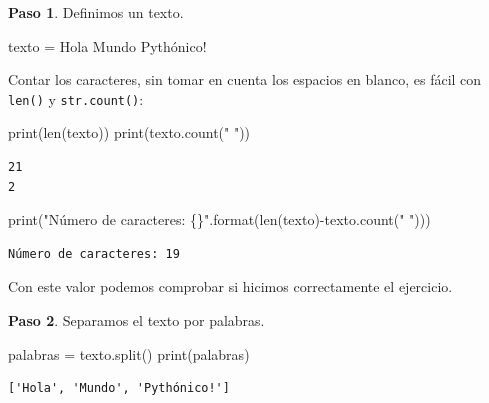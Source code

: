 \documentclass[
  spanish,
  letterpaper,
]{scrbook}
\newenvironment{Shaded}{\begin{snugshade}}{\end{snugshade}}
\newcommand{\BuiltInTok}[1]{\textcolor[rgb]{0.00,0.23,0.31}{#1}}
\newcommand{\NormalTok}[1]{\textcolor[rgb]{0.00,0.23,0.31}{#1}}
\newcommand{\OperatorTok}[1]{\textcolor[rgb]{0.37,0.37,0.37}{#1}}
\newcommand{\SpecialCharTok}[1]{\textcolor[rgb]{0.37,0.37,0.37}{#1}}
\newcommand{\StringTok}[1]{\textcolor[rgb]{0.13,0.47,0.30}{#1}}
\theoremstyle{definition}
\theoremstyle{remark}
\begin{document}
\textbf{Paso 1}. Definimos un texto.

\begin{Shaded}
\begin{Highlighting}[]
\NormalTok{texto }\OperatorTok{=} \StringTok{\textquotesingle{}Hola Mundo Pythónico!\textquotesingle{}}
\end{Highlighting}
\end{Shaded}

Contar los caracteres, sin tomar en cuenta los espacios en blanco, es
fácil con \texttt{len()} y \texttt{str.count()}:

\begin{Shaded}
\begin{Highlighting}[]
\BuiltInTok{print}\NormalTok{(}\BuiltInTok{len}\NormalTok{(texto))}
\BuiltInTok{print}\NormalTok{(texto.count(}\StringTok{" "}\NormalTok{))}
\end{Highlighting}
\end{Shaded}

\begin{verbatim}
21
2
\end{verbatim}

\begin{Shaded}
\begin{Highlighting}[]
\BuiltInTok{print}\NormalTok{(}\StringTok{"Número de caracteres: }\SpecialCharTok{\{\}}\StringTok{"}\NormalTok{.}\BuiltInTok{format}\NormalTok{(}\BuiltInTok{len}\NormalTok{(texto)}\OperatorTok{{-}}\NormalTok{texto.count(}\StringTok{" "}\NormalTok{)))}
\end{Highlighting}
\end{Shaded}

\begin{verbatim}
Número de caracteres: 19
\end{verbatim}

Con este valor podemos comprobar si hicimos correctamente el ejercicio.

\textbf{Paso 2}. Separamos el texto por palabras.

\begin{Shaded}
\begin{Highlighting}[]
\NormalTok{palabras }\OperatorTok{=}\NormalTok{ texto.split()}
\BuiltInTok{print}\NormalTok{(palabras)}
\end{Highlighting}
\end{Shaded}

\begin{verbatim}
['Hola', 'Mundo', 'Pythónico!']
\end{verbatim}
\end{document}
